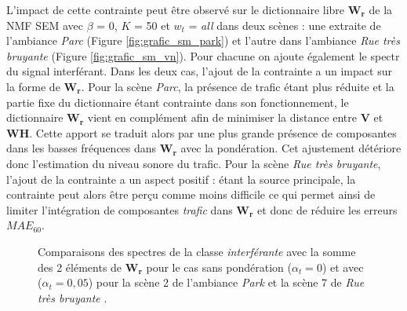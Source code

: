 L'impact de cette contrainte peut être observé sur le dictionnaire libre $\mathbf{W_r}$ de la NMF SEM avec $\beta$ = 0, $K$ = 50 et $w_t$ = \textit{all} dans deux scènes : une extraite de l'ambiance \textit{Parc} (Figure \ref{fig:grafic_sm_park}) et l'autre dans l'ambiance \textit{Rue très bruyante} (Figure \ref{fig:grafic_sm_vn}). Pour chacune on ajoute également le spectr du signal interférant. Dans les deux cas, l'ajout de la contrainte a un impact sur la forme de $\mathbf{W_r}$. Pour la scène \textit{Parc}, la présence de trafic étant plus réduite et la partie fixe du dictionnaire étant contrainte dans son fonctionnement, le dictionnaire $\mathbf{W_r}$ vient en complément afin de minimiser la distance entre $\mathbf{V}$ et $\mathbf{WH}$. Cette apport se traduit alors par une plus grande présence de composantes dans les basses fréquences dans $\mathbf{W_r}$ avec la pondération. Cet ajustement détériore donc l'estimation du niveau sonore du trafic. Pour la scène \textit{Rue très bruyante}, l'ajout de la contrainte a un aspect positif : étant la source principale, la contrainte peut alors être perçu comme moins \og difficile \fg{} ce qui permet ainsi de limiter l'intégration de composantes \textit{trafic} dans $\mathbf{W_r}$  et donc de réduire les erreurs $MAE_{60}$.

\begin{figure}[h!]
\centering
{}%
\qquad
{}%
\caption{Comparaisons des spectres de la classe \textit{interférante} avec la somme des 2 éléments de $\mathbf{W_r}$ pour le cas sans pondération ($\alpha_{t}= 0$) et avec ($\alpha_t = 0,05$) pour la scène 2 de l'ambiance \textit{Park}  et la scène 7 de \textit{Rue très bruyante} .}
\label{fig:grafic_sm}
\end{figure}

